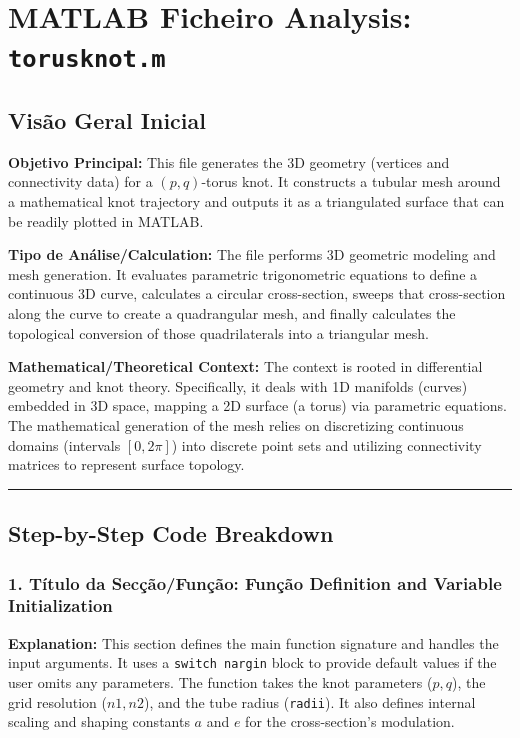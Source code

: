
\chapter{MATLAB Ficheiro Analysis: \texttt{torusknot.m}}
\section*{Visão Geral Inicial}

\textbf{Objetivo Principal:} This file generates the 3D geometry (vertices and connectivity data) for a $(p,q)$-torus knot. It constructs a tubular mesh around a mathematical knot trajectory and outputs it as a triangulated surface that can be readily plotted in MATLAB.

\textbf{Tipo de Análise/Calculation:} The file performs 3D geometric modeling and mesh generation. It evaluates parametric trigonometric equations to define a continuous 3D curve, calculates a circular cross-section, sweeps that cross-section along the curve to create a quadrangular mesh, and finally calculates the topological conversion of those quadrilaterals into a triangular mesh.

\textbf{Mathematical/Theoretical Context:} The context is rooted in differential geometry and knot theory. Specifically, it deals with 1D manifolds (curves) embedded in 3D space, mapping a 2D surface (a torus) via parametric equations. The mathematical generation of the mesh relies on discretizing continuous domains (intervals $[0, 2\pi]$) into discrete point sets and utilizing connectivity matrices to represent surface topology. 

\vspace{0.5cm}
\hrule
\vspace{0.5cm}

\section*{Step-by-Step Code Breakdown}

\subsection*{1. Título da Secção/Função: Função Definition and Variable Initialization}
\textbf{Explanation:} This section defines the main function signature and handles the input arguments. It uses a \texttt{switch nargin} block to provide default values if the user omits any parameters. The function takes the knot parameters ($p, q$), the grid resolution ($n1, n2$), and the tube radius (\texttt{radii}). It also defines internal scaling and shaping constants $a$ and $e$ for the cross-section's modulation.

